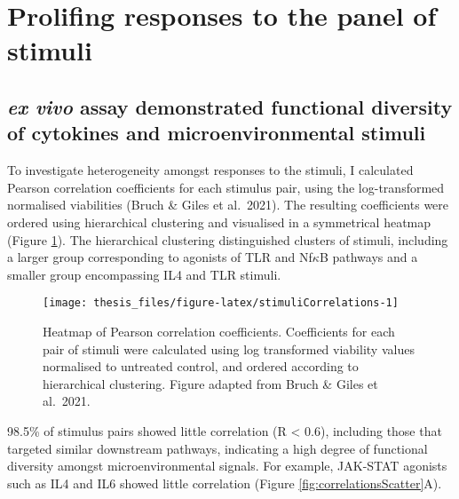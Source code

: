 \documentclass[11pt, a4paper, twosided]{book}
\begin{document}
\hypertarget{prolifing-responses-to-the-panel-of-stimuli}{%
\section{Prolifing responses to the panel of stimuli}\label{prolifing-responses-to-the-panel-of-stimuli}}

\hypertarget{ex-vivo-assay-demonstrated-functional-diversity-of-cytokines-and-microenvironmental-stimuli}{%
\subsection{\texorpdfstring{\emph{ex vivo} assay demonstrated functional diversity of cytokines and microenvironmental stimuli}{ex vivo assay demonstrated functional diversity of cytokines and microenvironmental stimuli}}\label{ex-vivo-assay-demonstrated-functional-diversity-of-cytokines-and-microenvironmental-stimuli}}

To investigate heterogeneity amongst responses to the stimuli, I calculated Pearson correlation coefficients for each stimulus pair, using the log-transformed normalised viabilities (Bruch \& Giles et al.~2021). The resulting coefficients were ordered using hierarchical clustering and visualised in a symmetrical heatmap (Figure \ref{fig:stimuliCorrelations}). The hierarchical clustering distinguished clusters of stimuli, including a larger group corresponding to agonists of TLR and Nf\(\kappa\)B pathways and a smaller group encompassing IL4 and TLR stimuli.


\begin{figure}

{\centering \texttt{[image: thesis\_files/figure-latex/stimuliCorrelations-1]} 

}

\caption{Heatmap of Pearson correlation coefficients. Coefficients for each pair of stimuli were calculated using log transformed viability values normalised to untreated control, and ordered according to hierarchical clustering. Figure adapted from Bruch \& Giles et al.~2021.}\label{fig:stimuliCorrelations}
\end{figure}
98.5\% of stimulus pairs showed little correlation (R \textless{} 0.6), including those that targeted similar downstream pathways, indicating a high degree of functional diversity amongst microenvironmental signals. For example, JAK-STAT agonists such as IL4 and IL6 showed little correlation (Figure \ref{fig:correlationsScatter}A).
\end{document}
